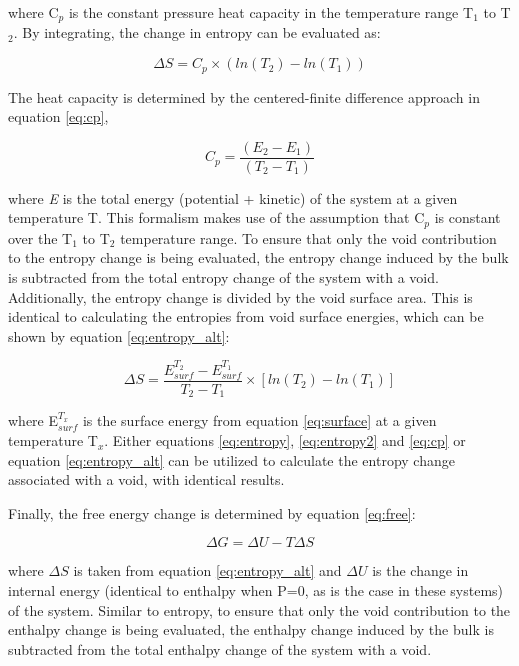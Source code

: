 \documentclass[review]{elsarticle}
\begin{document}
where C$_{p}$ is the constant pressure heat capacity in the temperature range T$_{1}$ to T$_{2}$. By integrating, the change in entropy can be evaluated as:

\begin{equation}
\label{eq:entropy2}
\Delta S = C_{p} \times (ln(T_{2}) - ln(T_{1})) 
\end{equation}

The heat capacity is determined by the centered-finite difference approach in equation \ref{eq:cp},

\begin{equation}
\label{eq:cp}
C_{p} = \frac{(E_{2} - E_{1})}{(T_{2} - T_{1})} 
\end{equation}

where \textit{E} is the total energy (potential + kinetic) of the system at a given temperature T. This formalism makes use of the assumption that C$_{p}$ is constant over the T$_{1}$ to T$_{2}$ temperature range. To ensure that only the void contribution to the entropy change is being evaluated, the entropy change induced by the bulk is subtracted from the total entropy change of the system with a void. Additionally, the entropy change is divided by the void surface area. This is identical to calculating the entropies from void surface energies, which can be shown by equation \ref{eq:entropy_alt}:

\begin{equation}
\label{eq:entropy_alt}
\Delta S =\frac{ E_{surf}^{T_2} - E_{surf}^{T_1}}{T_2 - T_1} \times [ ln(T_2) - ln(T_1) ]
\end{equation}

where E$_{surf}^{T_{x}}$ is the surface energy from equation \ref{eq:surface} at a given temperature T$_x$. Either equations \ref{eq:entropy}, \ref{eq:entropy2} and \ref{eq:cp} or equation \ref{eq:entropy_alt} can be utilized to calculate the entropy change associated with a void, with identical results. 

Finally, the free energy change is determined by equation \ref{eq:free}:

\begin{equation}
\label{eq:free}
\Delta G = \Delta U - T \Delta S
\end{equation}

where $\Delta S$ is taken from equation \ref{eq:entropy_alt} and $\Delta U$ is the change in internal energy (identical to enthalpy when P=0, as is the case in these systems) of the system. Similar to entropy, to ensure that only the void contribution to the enthalpy change is being evaluated, the enthalpy change induced by the bulk is subtracted from the total enthalpy change of the system with a void.
\end{document}
